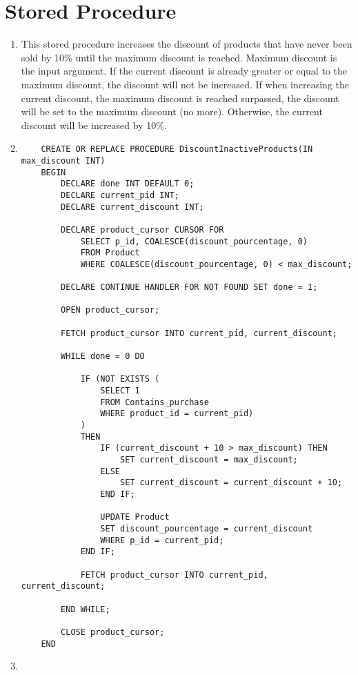 \documentclass[a4paper,11pt]{article}
\begin{document}
\section*{Stored Procedure}

\begin{enumerate}[label=(\alph*)]
    \item This stored procedure increases the discount of products that have never been sold by 10\% until the maximum discount is reached. Maximum discount is the input argument.
    If the current discount is already greater or equal to the maximum discount, the discount will not be increased.
    If when increasing the current discount, the maximum discount is reached surpassed, the discount will be set to the maximum discount (no more).
    Otherwise, the current discount will be increased by 10\%.
    \item
    \begin{lstlisting}
    CREATE OR REPLACE PROCEDURE DiscountInactiveProducts(IN max_discount INT)
    BEGIN
        DECLARE done INT DEFAULT 0;
        DECLARE current_pid INT;
        DECLARE current_discount INT;
    
        DECLARE product_cursor CURSOR FOR
            SELECT p_id, COALESCE(discount_pourcentage, 0)
            FROM Product
            WHERE COALESCE(discount_pourcentage, 0) < max_discount;
    
        DECLARE CONTINUE HANDLER FOR NOT FOUND SET done = 1;
    
        OPEN product_cursor;
    
        FETCH product_cursor INTO current_pid, current_discount;
    
        WHILE done = 0 DO

            IF (NOT EXISTS (
                SELECT 1
                FROM Contains_purchase
                WHERE product_id = current_pid)
            )
            THEN
                IF (current_discount + 10 > max_discount) THEN
                    SET current_discount = max_discount;
                ELSE 
                    SET current_discount = current_discount + 10;
                END IF;
    
                UPDATE Product
                SET discount_pourcentage = current_discount
                WHERE p_id = current_pid;
            END IF;
    
            FETCH product_cursor INTO current_pid, current_discount;
    
        END WHILE;
    
        CLOSE product_cursor;
    END
    \end{lstlisting}
    \item 
\end{enumerate}
\end{document}

